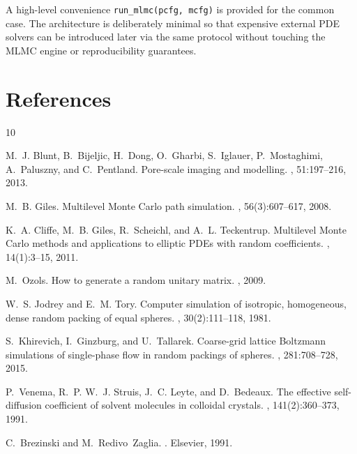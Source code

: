 \documentclass[preprint,12pt]{elsarticle}
\begin{document}
A high-level convenience \texttt{run\_mlmc(pcfg, mcfg)} is provided for the common case. The architecture is deliberately minimal so that expensive external PDE solvers can be introduced later via the same protocol without touching the MLMC engine or reproducibility guarantees.

\section*{References}

\begin{thebibliography}{10}

M.~J. Blunt, B.~Bijeljic, H.~Dong, O.~Gharbi, S.~Iglauer, P.~Mostaghimi, A.~Paluszny, and C.~Pentland.
\newblock Pore-scale imaging and modelling.
, 51:197--216, 2013.

M.~B. Giles.
\newblock Multilevel Monte Carlo path simulation.
, 56(3):607--617, 2008.

K.~A. Cliffe, M.~B. Giles, R.~Scheichl, and A.~L. Teckentrup.
\newblock Multilevel Monte Carlo methods and applications to elliptic PDEs with random coefficients.
, 14(1):3--15, 2011.

M.~Ozols.
\newblock How to generate a random unitary matrix.
, 2009.

W.~S. Jodrey and E.~M. Tory.
\newblock Computer simulation of isotropic, homogeneous, dense random packing of equal spheres.
, 30(2):111--118, 1981.

S.~Khirevich, I.~Ginzburg, and U.~Tallarek.
\newblock Coarse-grid lattice Boltzmann simulations of single-phase flow in random packings of spheres.
, 281:708--728, 2015.

P.~Venema, R.~P. W.~J. Struis, J.~C. Leyte, and D.~Bedeaux.
\newblock The effective self-diffusion coefficient of solvent molecules in colloidal crystals.
, 141(2):360--373, 1991.

C.~Brezinski and M.~Redivo~Zaglia.
.
\newblock Elsevier, 1991.


\end{thebibliography}
\end{document}
